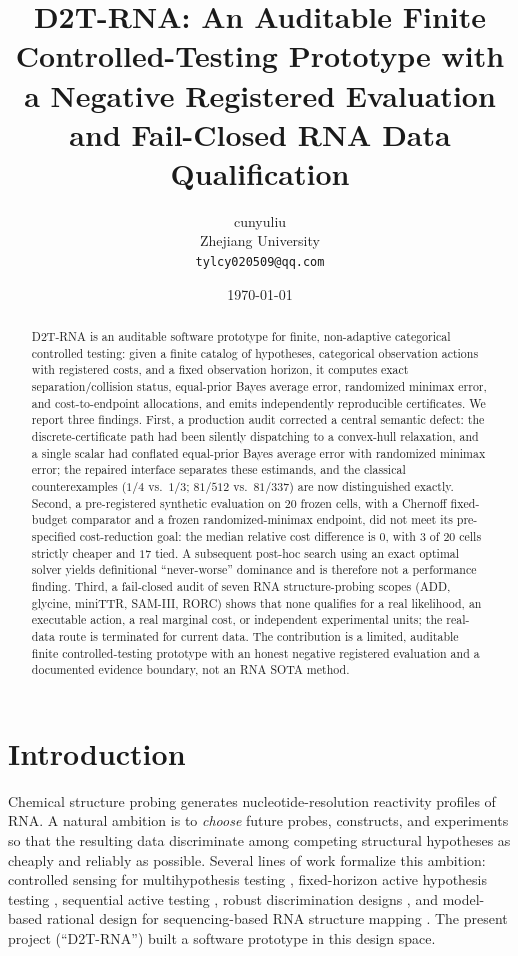 \documentclass[11pt]{article}
\title{\textbf{D2T-RNA: An Auditable Finite Controlled-Testing Prototype with a Negative Registered Evaluation and Fail-Closed RNA Data Qualification}}
\author{cunyuliu\\\small Zhejiang University\\\small \texttt{tylcy020509@qq.com}}
\date{\today}
\begin{document}
\maketitle

\begin{abstract}
\noindent D2T-RNA is an auditable software prototype for finite, non-adaptive categorical controlled testing: given a finite catalog of hypotheses, categorical observation actions with registered costs, and a fixed observation horizon, it computes exact separation/collision status, equal-prior Bayes average error, randomized minimax error, and cost-to-endpoint allocations, and emits independently reproducible certificates. We report three findings. First, a production audit corrected a central semantic defect: the discrete-certificate path had been silently dispatching to a convex-hull relaxation, and a single scalar had conflated equal-prior Bayes average error with randomized minimax error; the repaired interface separates these estimands, and the classical counterexamples ($1/4$ vs.\ $1/3$; $81/512$ vs.\ $81/337$) are now distinguished exactly. Second, a pre-registered synthetic evaluation on 20 frozen cells, with a Chernoff fixed-budget comparator and a frozen randomized-minimax endpoint, did not meet its pre-specified cost-reduction goal: the median relative cost difference is $0$, with $3$ of $20$ cells strictly cheaper and $17$ tied. A subsequent post-hoc search using an exact optimal solver yields definitional ``never-worse'' dominance and is therefore not a performance finding. Third, a fail-closed audit of seven RNA structure-probing scopes (ADD, glycine, miniTTR, SAM-III, RORC) shows that none qualifies for a real likelihood, an executable action, a real marginal cost, or independent experimental units; the real-data route is terminated for current data. The contribution is a limited, auditable finite controlled-testing prototype with an honest negative registered evaluation and a documented evidence boundary, not an RNA SOTA method.
\end{abstract}

\section{Introduction}\label{sec:intro}

Chemical structure probing generates nucleotide-resolution reactivity profiles of RNA. A natural ambition is to \emph{choose} future probes, constructs, and experiments so that the resulting data discriminate among competing structural hypotheses as cheaply and reliably as possible. Several lines of work formalize this ambition: controlled sensing for multihypothesis testing \cite{nitinawarat2013controlled}, fixed-horizon active hypothesis testing \cite{kartik2022fixed}, sequential active testing \cite{naghshvar2013active}, robust discrimination designs \cite{wiens2009robust}, and model-based rational design for sequencing-based RNA structure mapping \cite{aviran2014rational}. The present project (``D2T-RNA'') built a software prototype in this design space.
\end{document}
